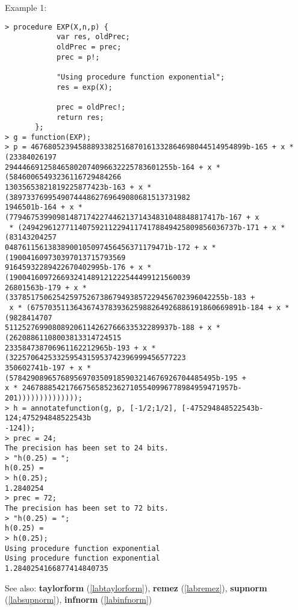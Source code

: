 \noindent Example 1: 
\begin{center}\begin{minipage}{15cm}\begin{Verbatim}[frame=single]
> procedure EXP(X,n,p) {
            var res, oldPrec;
            oldPrec = prec;
            prec = p!;
            
            "Using procedure function exponential";
            res = exp(X);
            
            prec = oldPrec!;
            return res;
       };
> g = function(EXP);
> p = 46768052394588893382516870161332864698044514954899b-165 + x * (23384026197
294446691258465802074096632225783601255b-164 + x * (58460065493236116729484266
13035653821819225877423b-163 + x * (389733769954907444862769649080681513731982
1946501b-164 + x * (7794675399098148717422744621371434831048848817417b-167 + x
 * (24942961277114075921122941174178849425809856036737b-171 + x * (83143204257
04876115613838900105097456456371179471b-172 + x * (190041609730397013715793569
91645932289422670402995b-176 + x * (190041609726693241489121222544499121560039
26801563b-179 + x * (33785175062542597526738679493857229456702396042255b-183 +
 x * (6757035113643674378393625988264926886191860669891b-184 + x * (9828414707
511252769908089206114262766633532289937b-188 + x * (26208861108003813314724515
233584738706961162212965b-193 + x * (32257064253325954315953742396999456577223
350602741b-197 + x * (578429089657689569703509185903214676926704485495b-195 + 
x * 2467888542176675658523627105540996778984959471957b-201))))))))))))));
> h = annotatefunction(g, p, [-1/2;1/2], [-475294848522543b-124;475294848522543b
-124]);
> prec = 24;
The precision has been set to 24 bits.
> "h(0.25) = ";
h(0.25) = 
> h(0.25);
1.2840254
> prec = 72;
The precision has been set to 72 bits.
> "h(0.25) = ";
h(0.25) = 
> h(0.25);
Using procedure function exponential
Using procedure function exponential
1.2840254166877414840735
\end{Verbatim}
\end{minipage}\end{center}
See also: \textbf{taylorform} (\ref{labtaylorform}), \textbf{remez} (\ref{labremez}), \textbf{supnorm} (\ref{labsupnorm}), \textbf{infnorm} (\ref{labinfnorm})
